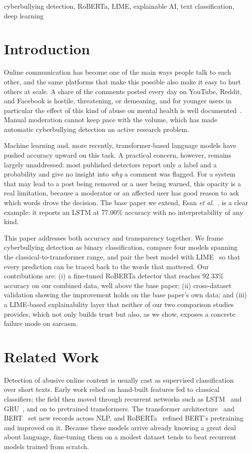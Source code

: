 \documentclass[conference]{IEEEtran}
\begin{document}
\begin{IEEEkeywords}
cyberbullying detection, RoBERTa, LIME, explainable AI, text classification, deep learning
\end{IEEEkeywords}

\section{Introduction}
Online communication has become one of the main ways people talk to each other, and the same platforms that make this possible also make it easy to hurt others at scale. A share of the comments posted every day on YouTube, Reddit, and Facebook is hostile, threatening, or demeaning, and for younger users in particular the effect of this kind of abuse on mental health is well documented~\cite{review2023dl}. Manual moderation cannot keep pace with the volume, which has made automatic cyberbullying detection an active research problem.

Machine learning and, more recently, transformer-based language models have pushed accuracy upward on this task. A practical concern, however, remains largely unaddressed: most published detectors report only a label and a probability and give no insight into \emph{why} a comment was flagged. For a system that may lead to a post being removed or a user being warned, this opacity is a real limitation, because a moderator or an affected user has good reason to ask which words drove the decision. The base paper we extend, Esan \emph{et al.}~\cite{esan2024lstm}, is a clear example: it reports an LSTM at 77.00\% accuracy with no interpretability of any kind.

This paper addresses both accuracy and transparency together. We frame cyberbullying detection as binary classification, compare four models spanning the classical-to-transformer range, and pair the best model with LIME~\cite{ribeiro2016lime} so that every prediction can be traced back to the words that mattered. Our contributions are: (i) a fine-tuned RoBERTa detector that reaches 92.33\% accuracy on our combined data, well above the base paper; (ii) cross-dataset validation showing the improvement holds on the base paper's own data; and (iii) a LIME-based explainability layer that neither of our two comparison studies provides, which not only builds trust but also, as we show, exposes a concrete failure mode on sarcasm.

\section{Related Work}
Detection of abusive online content is usually cast as supervised classification over short texts. Early work relied on hand-built features fed to classical classifiers; the field then moved through recurrent networks such as LSTM~\cite{hochreiter1997lstm} and GRU~\cite{cho2014gru}, and on to pretrained transformers. The transformer architecture~\cite{vaswani2017attention} and BERT~\cite{devlin2019bert} set new records across NLP, and RoBERTa~\cite{liu2019roberta} refined BERT's pretraining and improved on it. Because these models arrive already knowing a great deal about language, fine-tuning them on a modest dataset tends to beat recurrent models trained from scratch.
\end{document}
